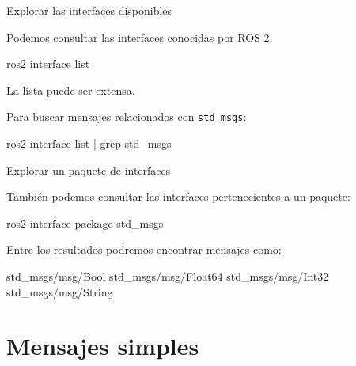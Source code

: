\documentclass[aspectratio=169]{beamer}
\begin{document}
\begin{frame}[fragile]{Explorar las interfaces disponibles}

    Podemos consultar las interfaces conocidas por ROS 2:

    \begin{bashcodedark}
        ros2 interface list
    \end{bashcodedark}

    La lista puede ser extensa.

    Para buscar mensajes relacionados con \texttt{std\_msgs}:

    \begin{bashcodedark}
        ros2 interface list | grep std_msgs
    \end{bashcodedark}

    \vspace{0.3cm}


\end{frame}

\begin{frame}[fragile]{Explorar un paquete de interfaces}

    También podemos consultar las interfaces pertenecientes a un paquete:

    \begin{bashcodedark}
        ros2 interface package std_msgs
    \end{bashcodedark}

    Entre los resultados podremos encontrar mensajes como:

    \begin{consolecodedark}
        std_msgs/msg/Bool
        std_msgs/msg/Float64
        std_msgs/msg/Int32
        std_msgs/msg/String
    \end{consolecodedark}

    \vspace{0.3cm}


\end{frame}

\section{Mensajes simples}
\end{document}
